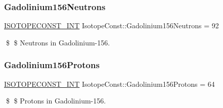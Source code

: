 \subsubsection{\texorpdfstring{Gadolinium156\+Neutrons}{Gadolinium156Neutrons}}
{\footnotesize\ttfamily \mbox{\hyperlink{group___isotope_const-_macros_ga5f18360b3e99483a35c32d789e62621c}{I\+S\+O\+T\+O\+P\+E\+C\+O\+N\+S\+T\+\_\+\+I\+NT}} Isotope\+Const\+::\+Gadolinium156\+Neutrons = 92}

\$ \$ Neutrons in Gadolinium-\/156. \mbox{\label{group___isotope_const-_gadolinium-_gd156_ga0cdc0c787a93cfcf23a788611e4178dd}} 
\subsubsection{\texorpdfstring{Gadolinium156\+Protons}{Gadolinium156Protons}}
{\footnotesize\ttfamily \mbox{\hyperlink{group___isotope_const-_macros_ga5f18360b3e99483a35c32d789e62621c}{I\+S\+O\+T\+O\+P\+E\+C\+O\+N\+S\+T\+\_\+\+I\+NT}} Isotope\+Const\+::\+Gadolinium156\+Protons = 64}

\$ \$ Protons in Gadolinium-\/156. 